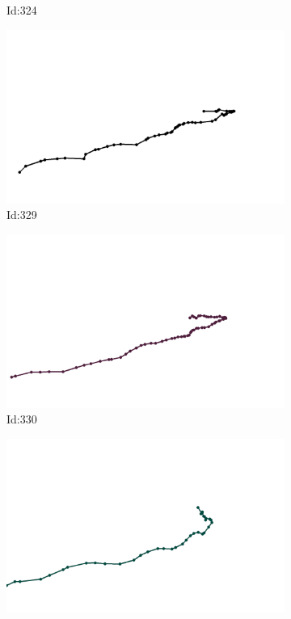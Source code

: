 \documentclass[12pt,twoside]{report}
\begin{document}
\begin{figure}
\begin{subfigure}[b]{0.20\textwidth}
\caption{Id:324}
\end{subfigure}
\begin{subfigure}[b]{0.20\textwidth}
\centering
\includegraphics[width=\textwidth]{../trajectories/329.png}
\caption{Id:329}
\end{subfigure}
\begin{subfigure}[b]{0.20\textwidth}
\centering
\includegraphics[width=\textwidth]{../trajectories/330.png}
\caption{Id:330}
\end{subfigure}
\begin{subfigure}[b]{0.20\textwidth}
\centering
\includegraphics[width=\textwidth]{../trajectories/353.png}

\end{subfigure}
\end{figure}
\end{document}

